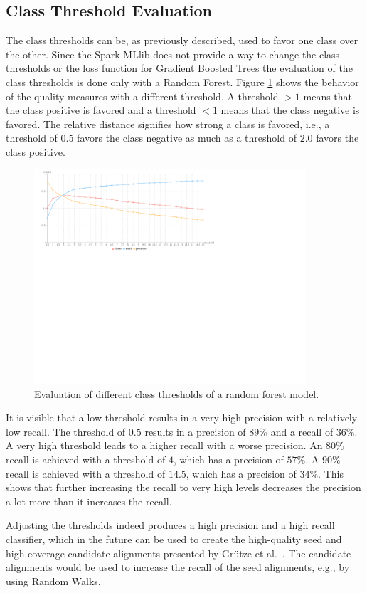 \subsection{Class Threshold Evaluation}
The class thresholds can be, as previously described, used to favor one class over the other. Since the Spark MLlib does not provide a way to change the class thresholds or the loss function for Gradient Boosted Trees the evaluation of the class thresholds is done only with a Random Forest. Figure \ref{rf_thresh_large} shows the behavior of the quality measures with a different threshold. A threshold $> 1$ means that the class positive is favored and a threshold $< 1$ means that the class negative is favored. The relative distance signifies how strong a class is favored, i.e., a threshold of $0.5$ favors the class negative as much as a threshold of $2.0$ favors the class positive.\par
\begin{figure}[H]
	\centering
	\includegraphics[width=0.9\textwidth]{img/rf_thresh_large}
	\caption{Evaluation of different class thresholds of a random forest model.}
	\label{rf_thresh_large}
\end{figure}
It is visible that a low threshold results in a very high precision with a relatively low recall. The threshold of $0.5$ results in a precision of $89\%$ and a recall of $36\%$. A very high threshold leads to a higher recall with a worse precision. An $80\%$ recall is achieved with a threshold of $4$, which has a precision of $57\%$. A $90\%$ recall is achieved with a threshold of $14.5$, which has a precision of $34\%$. This shows that further increasing the recall to very high levels decreases the precision a lot more than it increases the recall.\par
Adjusting the thresholds indeed produces a high precision and a high recall classifier, which in the future can be used to create the high-quality seed and high-coverage candidate alignments presented by Grütze et al.\ \cite{coheel}. The candidate alignments would be used to increase the recall of the seed alignments, e.g., by using Random Walks.\par

